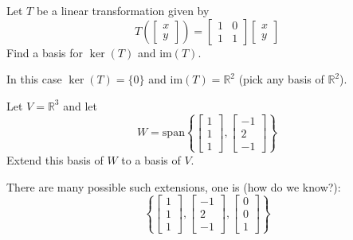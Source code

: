 \documentclass{ximera}
\begin{document}
\begin{problem}\label{prb:10.88}
 Let $T$ be a linear transformation given by
\[
T\left( \left[ \begin{array}{r}
x\\
y
\end{array}\right]\right) = \left[ \begin{array}{rrr}
1 & 0  \\
1 & 1
\end{array}\right]
\left[ \begin{array}{r}
x\\
y
\end{array}\right]
\]
Find a basis for $\ker \left( T\right)$ and $\mbox{im}
\left( T\right) $.

\begin{hint}
In this case $\ker \left( T\right) =\{0\}$
and $\mbox{im} \left( T\right) = \mathbb{R}^2$ (pick any basis of $\mathbb{R}^2$).
\end{hint}

\end{problem}



\begin{problem}\label{prb:10.89}
Let $V=\mathbb{R}^{3}$ and let
\begin{equation*}
W=\mbox{span}\left\{ \left[
\begin{array}{r}
1 \\
1 \\
1
\end{array}
\right] ,\left[
\begin{array}{r}
-1 \\
2 \\
-1
\end{array}
\right] \right\}
\end{equation*}
Extend this basis of $W$ to a basis of $V$.

\begin{hint}
There are many possible such extensions, one is (how do we know?):
\begin{equation*}
\left\{ \left[
\begin{array}{r}
1 \\
1 \\
1
\end{array}
\right] ,\left[
\begin{array}{r}
-1 \\
2 \\
-1
\end{array}
\right] ,\left[
\begin{array}{r}
0  \\
0\\
1
\end{array}
\right]
\right\}
\end{equation*}
\end{hint}
\end{problem}
\end{document}
